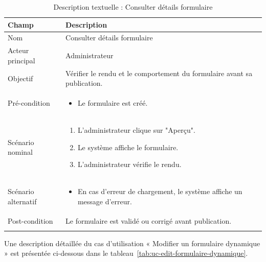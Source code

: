  
\begin{longtable}{|p{4cm}|p{12cm}|}
\hline

\rowcolor{gray!20}
\textbf{Champ} & \textbf{Description} \\ \hline
\endfirsthead

 

Nom & Consulter détails formulaire \\ \hline

Acteur principal & Administrateur \\ \hline

Objectif & Vérifier le rendu et le comportement du formulaire avant sa publication. \\ \hline

Pré-condition &
\begin{itemize}
    \item Le formulaire est créé.
\end{itemize}
\\ \hline

Scénario nominal &
\begin{enumerate}
    \item L’administrateur clique sur "Aperçu".
    \item Le système affiche le formulaire.
    \item L’administrateur vérifie le rendu.
\end{enumerate}
\\ \hline

Scénario alternatif &
\begin{itemize}
    \item En cas d’erreur de chargement, le système affiche un message d’erreur.
\end{itemize}
\\ \hline

Post-condition & Le formulaire est validé ou corrigé avant publication. \\ \hline

\caption{Description textuelle : Consulter détails formulaire}
\label{tab:uc-preview}

\end{longtable}
 


Une description détaillée du cas d’utilisation « Modifier un formulaire dynamique » est présentée ci-dessous dans le tableau~\ref{tab:uc-edit-formulaire-dynamique}.


